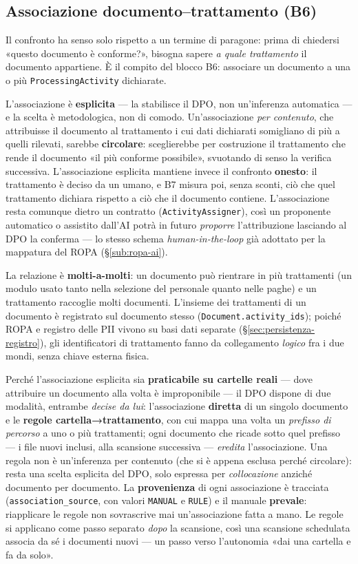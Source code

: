 \subsection{Associazione documento--trattamento (B6)}
\label{sub:b6-associazione}

Il confronto ha senso solo rispetto a un termine di paragone: prima di chiedersi «questo documento è conforme?», bisogna sapere \emph{a quale trattamento} il documento appartiene. È il compito del blocco B6: associare un documento a una o più \texttt{ProcessingActivity} dichiarate.

L'associazione è \textbf{esplicita} --- la stabilisce il DPO, non un'inferenza automatica --- e la scelta è metodologica, non di comodo. Un'associazione \emph{per contenuto}, che attribuisse il documento al trattamento i cui dati dichiarati somigliano di più a quelli rilevati, sarebbe \textbf{circolare}: sceglierebbe per costruzione il trattamento che rende il documento «il più conforme possibile», svuotando di senso la verifica successiva. L'associazione esplicita mantiene invece il confronto \textbf{onesto}: il trattamento è deciso da un umano, e B7 misura poi, senza sconti, ciò che quel trattamento dichiara rispetto a ciò che il documento contiene. L'associazione resta comunque dietro un contratto (\texttt{ActivityAssigner}), così un proponente automatico o assistito dall'AI potrà in futuro \emph{proporre} l'attribuzione lasciando al DPO la conferma --- lo stesso schema \emph{human-in-the-loop} già adottato per la mappatura del ROPA (§\ref{sub:ropa-ai}).

La relazione è \textbf{molti-a-molti}: un documento può rientrare in più trattamenti (un modulo usato tanto nella selezione del personale quanto nelle paghe) e un trattamento raccoglie molti documenti. L'insieme dei trattamenti di un documento è registrato sul documento stesso (\texttt{Document.activity\_ids}); poiché ROPA e registro delle PII vivono su basi dati separate (§\ref{sec:persistenza-registro}), gli identificatori di trattamento fanno da collegamento \emph{logico} fra i due mondi, senza chiave esterna fisica.

Perché l'associazione esplicita sia \textbf{praticabile su cartelle reali} --- dove attribuire un documento alla volta è improponibile --- il DPO dispone di due modalità, entrambe \emph{decise da lui}: l'associazione \textbf{diretta} di un singolo documento e le \textbf{regole cartella→trattamento}, con cui mappa una volta un \emph{prefisso di percorso} a uno o più trattamenti; ogni documento che ricade sotto quel prefisso --- i file nuovi inclusi, alla scansione successiva --- \emph{eredita} l'associazione. Una regola non è un'inferenza per contenuto (che si è appena esclusa perché circolare): resta una scelta esplicita del DPO, solo espressa per \emph{collocazione} anziché documento per documento. La \textbf{provenienza} di ogni associazione è tracciata (\texttt{association\_source}, con valori \texttt{MANUAL} e \texttt{RULE}) e il manuale \textbf{prevale}: riapplicare le regole non sovrascrive mai un'associazione fatta a mano. Le regole si applicano come passo separato \emph{dopo} la scansione, così una scansione schedulata associa da sé i documenti nuovi --- un passo verso l'autonomia «dai una cartella e fa da solo».


